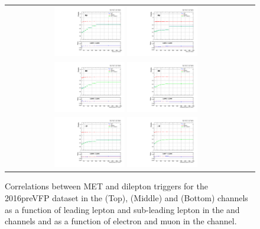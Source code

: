 \begin{figure}[htb]
  \begin{center}
    \begin{tabular}{cc}
      \includegraphics[width=0.30\textwidth]{fig_2016preVFP_TrigSF/g_lepApt_emu_alpha.pdf}
      \includegraphics[width=0.30\textwidth]{fig_2016preVFP_TrigSF/g_lepBpt_emu_alpha.pdf}\\
      \includegraphics[width=0.30\textwidth]{fig_2016preVFP_TrigSF/g_lepApt_ee_alpha.pdf}
      \includegraphics[width=0.30\textwidth]{fig_2016preVFP_TrigSF/g_lepBpt_ee_alpha.pdf}\\
      \includegraphics[width=0.30\textwidth]{fig_2016preVFP_TrigSF/g_lepApt_mumu_alpha.pdf}
      \includegraphics[width=0.30\textwidth]{fig_2016preVFP_TrigSF/g_lepBpt_mumu_alpha.pdf}\\
    \end{tabular}
    \caption{Correlations between MET and dilepton triggers for the 2016preVFP dataset in the \emu (Top), \ee (Middle) and \mumu (Bottom) channels as a function of leading lepton \pT and sub-leading lepton \pT in the \ee and \mumu channels and as a function of electron \pT and muon \pT in the \emu channel.}
    \label{TrigSF_2016preVFP_5}
  \end{center}
\end{figure}


